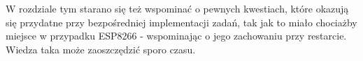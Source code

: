 W rozdziale tym starano się też wspominać o pewnych kwestiach, które okazują się przydatne przy bezpośredniej implementacji zadań, tak jak to miało chociażby miejsce w przypadku ESP8266 - wspominając o jego zachowaniu przy restarcie. Wiedza taka może zaoszczędzić sporo czasu.

\label{sec:przygotowanieDokumentu}

